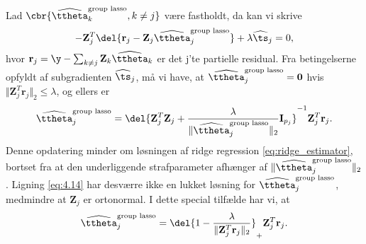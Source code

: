 Lad $\cbr{\widehat{\ttheta}^\text{group lasso}_k, k \neq j}$ være fastholdt, da kan vi skrive
\begin{align*}
- \mathbf{Z}_{j}^T \del{\mathbf{r}_j - \mathbf{Z}_j \widehat{\ttheta}^\text{group lasso}_j} + \lambda \widehat{\ts}_j = 0,
\end{align*}
hvor $\mathbf{r}_j = \y - \sum_{k \neq j} \mathbf{Z}_k \widehat{\ttheta}_k $ er det j'te partielle residual.
Fra betingelserne opfyldt af subgradienten $\widehat{\ts}_j$, må vi have, at $\widehat{\ttheta}^\text{group lasso}_j =\mathbf{0}$ hvis $\Vert \mathbf{Z}_j^T \mathbf{r}_j \Vert_2 \leq \lambda$, og ellers er
\begin{align}
\widehat{\ttheta}_j^\text{group lasso} = \del{\mathbf{Z}_j^T \mathbf{Z}_j + \frac{\lambda}{\Vert \widehat{\ttheta}^\text{group lasso}_j \Vert_2} \mathbf{I}_{p_j}}^{-1} \mathbf{Z}_j^T \mathbf{r}_j. \label{eq:4.14}
\end{align}
Denne opdatering minder om løsningen af ridge regression \eqref{eq:ridge_estimator}, bortset fra at den underliggende strafparameter afhænger af $\Vert \widehat{\ttheta}^\text{group lasso}_j \Vert_2$.
Ligning \eqref{eq:4.14} har desværre ikke en lukket løsning for $\widehat{\ttheta}^\text{group lasso}_j$, medmindre at $\mathbf{Z}_j$ er ortonormal. 
I dette special tilfælde har vi, at
\begin{align*}
\widehat{\ttheta}^\text{group lasso}_j = \del{1 - \frac{\lambda}{\Vert \mathbf{Z}_j^T \mathbf{r}_j \Vert_2}}_+  \mathbf{Z}_j^T \mathbf{r}_j.
\end{align*}

